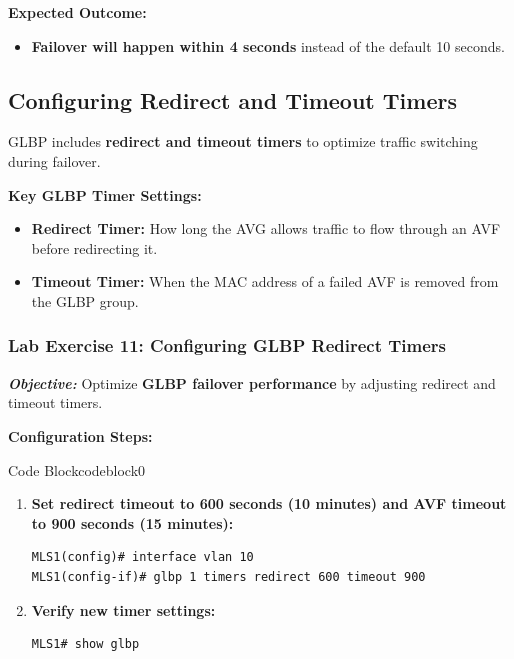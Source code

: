 \documentclass[a4paper]{book}
\begin{document}
\textbf{Expected Outcome:}
\begin{itemize}
\item \textbf{Failover will happen within 4 seconds} instead of the default 10 seconds.
\end{itemize}

\subsection{Configuring Redirect and Timeout Timers}
GLBP includes \textbf{redirect and timeout timers} to optimize traffic switching during failover.

\textbf{Key GLBP Timer Settings:}
\begin{itemize}
\item \textbf{Redirect Timer:} How long the AVG allows traffic to flow through an AVF 
before redirecting it.
\item \textbf{Timeout Timer:} When the MAC address of a failed AVF is removed from the GLBP group.
\end{itemize}

\subsubsection{Lab Exercise 11: Configuring GLBP Redirect Timers}
\textbf{\textit{Objective:}} Optimize \textbf{GLBP failover performance} by adjusting redirect 
and timeout timers.
\vspace{1.5em}

\textbf{Configuration Steps:}

\vspace{1.5em}


\begin{ocg}{Code Block}{codeblock}{0}

\vspace{0.5cm}

\begin{enumerate}
\item \textbf{Set redirect timeout to 600 seconds (10 minutes) and AVF timeout to 900 seconds (15 minutes):}
\begin{lstlisting}
MLS1(config)# interface vlan 10
MLS1(config-if)# glbp 1 timers redirect 600 timeout 900
\end{lstlisting}

\item \textbf{Verify new timer settings:}
\begin{lstlisting}
MLS1# show glbp
\end{lstlisting}
\end{enumerate}
\end{ocg}
\end{document}
